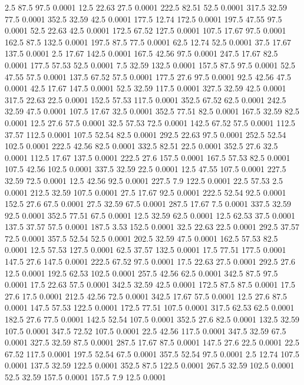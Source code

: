 2.5	87.5	97.5	0.0001
12.5	22.63	27.5	0.0001
222.5	82.51	52.5	0.0001
317.5	32.59	77.5	0.0001
352.5	32.59	42.5	0.0001
177.5	12.74	172.5	0.0001
197.5	47.55	97.5	0.0001
52.5	22.63	42.5	0.0001
172.5	67.52	127.5	0.0001
107.5	17.67	97.5	0.0001
162.5	87.5	132.5	0.0001
197.5	87.5	77.5	0.0001
62.5	12.74	52.5	0.0001
37.5	17.67	137.5	0.0001
2.5	17.67	142.5	0.0001
167.5	42.56	97.5	0.0001
247.5	17.67	82.5	0.0001
177.5	57.53	52.5	0.0001
7.5	32.59	132.5	0.0001
157.5	87.5	97.5	0.0001
52.5	47.55	57.5	0.0001
137.5	67.52	57.5	0.0001
177.5	27.6	97.5	0.0001
92.5	42.56	47.5	0.0001
42.5	17.67	147.5	0.0001
52.5	32.59	117.5	0.0001
327.5	32.59	42.5	0.0001
317.5	22.63	22.5	0.0001
152.5	57.53	117.5	0.0001
352.5	67.52	62.5	0.0001
242.5	32.59	47.5	0.0001
107.5	17.67	32.5	0.0001
352.5	77.51	82.5	0.0001
167.5	32.59	82.5	0.0001
12.5	27.6	57.5	0.0001
32.5	57.53	72.5	0.0001
142.5	67.52	57.5	0.0001
112.5	37.57	112.5	0.0001
107.5	52.54	82.5	0.0001
292.5	22.63	97.5	0.0001
252.5	52.54	102.5	0.0001
222.5	42.56	82.5	0.0001
332.5	82.51	22.5	0.0001
352.5	27.6	32.5	0.0001
112.5	17.67	137.5	0.0001
222.5	27.6	157.5	0.0001
167.5	57.53	82.5	0.0001
107.5	42.56	102.5	0.0001
337.5	32.59	22.5	0.0001
12.5	47.55	107.5	0.0001
227.5	32.59	72.5	0.0001
12.5	42.56	92.5	0.0001
227.5	7.9	122.5	0.0001
22.5	57.53	2.5	0.0001
212.5	32.59	107.5	0.0001
27.5	17.67	92.5	0.0001
222.5	52.54	92.5	0.0001
152.5	27.6	67.5	0.0001
27.5	32.59	67.5	0.0001
287.5	17.67	7.5	0.0001
337.5	32.59	92.5	0.0001
352.5	77.51	67.5	0.0001
12.5	32.59	62.5	0.0001
12.5	62.53	37.5	0.0001
137.5	37.57	57.5	0.0001
187.5	3.53	152.5	0.0001
32.5	22.63	22.5	0.0001
292.5	37.57	72.5	0.0001
357.5	52.54	52.5	0.0001
202.5	32.59	47.5	0.0001
162.5	57.53	82.5	0.0001
12.5	57.53	127.5	0.0001
62.5	37.57	132.5	0.0001
17.5	77.51	177.5	0.0001
147.5	27.6	147.5	0.0001
222.5	67.52	97.5	0.0001
17.5	22.63	27.5	0.0001
292.5	27.6	12.5	0.0001
192.5	62.53	102.5	0.0001
257.5	42.56	62.5	0.0001
342.5	87.5	97.5	0.0001
17.5	22.63	57.5	0.0001
342.5	32.59	42.5	0.0001
172.5	87.5	87.5	0.0001
17.5	27.6	17.5	0.0001
212.5	42.56	72.5	0.0001
342.5	17.67	57.5	0.0001
12.5	27.6	87.5	0.0001
147.5	57.53	122.5	0.0001
172.5	77.51	107.5	0.0001
317.5	62.53	62.5	0.0001
182.5	27.6	77.5	0.0001
142.5	52.54	107.5	0.0001
352.5	27.6	82.5	0.0001
132.5	32.59	107.5	0.0001
347.5	72.52	107.5	0.0001
22.5	42.56	117.5	0.0001
347.5	32.59	67.5	0.0001
327.5	32.59	87.5	0.0001
287.5	17.67	87.5	0.0001
147.5	27.6	22.5	0.0001
22.5	67.52	117.5	0.0001
197.5	52.54	67.5	0.0001
357.5	52.54	97.5	0.0001
2.5	12.74	107.5	0.0001
137.5	32.59	122.5	0.0001
352.5	87.5	122.5	0.0001
267.5	32.59	102.5	0.0001
52.5	32.59	157.5	0.0001
157.5	7.9	12.5	0.0001
